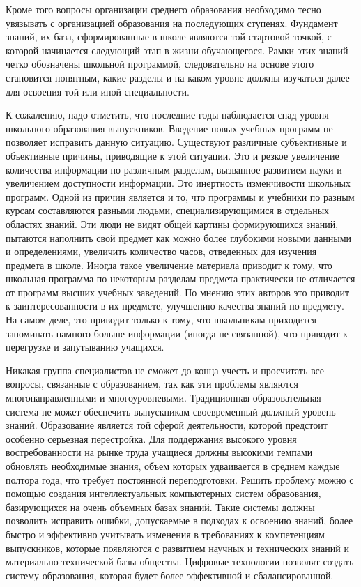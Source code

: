 Кроме того вопросы организации среднего образования необходимо тесно увязывать с организацией образования на последующих ступенях. Фундамент знаний, их база, сформированные в школе являются той стартовой точкой, с которой начинается следующий этап в жизни обучающегося. Рамки этих знаний четко обозначены школьной программой, следовательно на основе этого становится понятным, какие разделы и на каком уровне должны изучаться далее для освоения той или иной специальности.

К сожалению, надо отметить, что последние годы наблюдается спад уровня школьного образования выпускников. Введение новых учебных программ не позволяет исправить данную ситуацию. Существуют различные субъективные и объективные причины, приводящие к этой ситуации. Это и резкое увеличение количества информации по различным разделам, вызванное развитием науки и увеличением доступности информации. Это инертность изменчивости школьных программ. Одной из причин является и то, что программы и учебники по разным курсам составляются разными людьми, специализирующимися в отдельных областях знаний. Эти люди не видят общей картины формирующихся знаний, пытаются наполнить свой предмет как можно более глубокими новыми данными и определениями, увеличить количество часов, отведенных для изучения предмета в школе. Иногда такое увеличение материала приводит к тому, что школьная программа по некоторым разделам предмета практически не отличается от программ высших учебных заведений. По мнению этих авторов это приводит к заинтересованности в их предмете, улучшению качества знаний по предмету. На самом деле, это приводит только к тому, что школьникам приходится запоминать намного больше информации (иногда не связанной), что приводит к перегрузке и запутыванию учащихся.

Никакая группа специалистов не сможет до конца учесть и просчитать все вопросы, связанные с образованием, так как эти проблемы являются многонаправленными и многоуровневыми. Традиционная образовательная система не может обеспечить выпускникам своевременный должный уровень знаний. Образование является той сферой деятельности, которой предстоит особенно серьезная перестройка. Для поддержания высокого уровня востребованности на рынке труда учащиеся должны высокими темпами обновлять необходимые знания, объем которых удваивается в среднем каждые полтора года, что требует постоянной переподготовки. Решить проблему можно с помощью создания интеллектуальных компьютерных систем образования, базирующихся на очень объемных базах знаний. Такие системы должны позволить исправить ошибки, допускаемые в подходах к освоению знаний, более быстро и эффективно учитывать изменения в требованиях к компетенциям выпускников, которые появляются с развитием научных и технических знаний и материально-технической базы общества. Цифровые технологии позволят создать систему образования, которая будет более эффективной и сбалансированной. 

